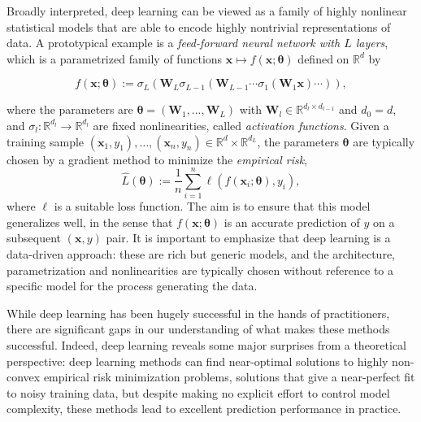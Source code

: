 Broadly interpreted, deep learning can be viewed as a family of highly nonlinear statistical models that are able to encode highly nontrivial representations of data. A prototypical example is a {\em
feed-forward neural network with $L$ layers}, which is a parametrized family of functions ${\boldsymbol x}\mapsto f({\boldsymbol x};{\boldsymbol \theta})$ defined on ${\mathbb R}^d$ by

\begin{equation}\label{eqn:FFNN}
    f({\boldsymbol x};{\boldsymbol \theta}) := \sigma_L({\boldsymbol W}_L\sigma_{L-1}({\boldsymbol W}_{L-1}
      \cdots \sigma_1({\boldsymbol W}_1{\boldsymbol x})\cdots)),
  \end{equation}

where the parameters are ${\boldsymbol \theta}=({\boldsymbol W}_1,\ldots,{\boldsymbol W}_L)$ with ${\boldsymbol W}_l\in{\mathbb R}^{d_l\times d_{l-1}}$ and $d_0=d$, and
$\sigma_l: {\mathbb R}^{d_l}\to{\mathbb R}^{d_l}$ are fixed nonlinearities, called {\em activation functions}.  Given a training sample
$({\boldsymbol x}_1,y_1),\ldots,({\boldsymbol x}_n,y_n)\in{\mathbb R}^{d}\times{\mathbb R}^{d_L}$, the parameters ${\boldsymbol \theta}$ are typically chosen by a gradient method to minimize the {\em empirical risk},
  \[
    \widehat L({\boldsymbol \theta}) := \frac{1}{n}\sum_{i=1}^n \ell(f({\boldsymbol x}_i;{\boldsymbol \theta}),y_i),
  \]
where $\ell$ is a suitable loss function. The aim is to ensure that this model generalizes well, in the sense that $f({\boldsymbol x};{\boldsymbol \theta})$
is an accurate prediction of $y$ on a subsequent $({\boldsymbol x},y)$ pair. It is important to emphasize that deep learning is a data-driven approach: these are rich but generic models, and the architecture, parametrization and nonlinearities are typically chosen without reference to a specific model for the process generating the data.

While deep learning has been hugely successful in the hands of practitioners, there are significant gaps in our understanding of what makes these methods successful. Indeed, deep learning reveals some major surprises from a theoretical perspective: deep learning methods can find near-optimal solutions to highly non-convex empirical risk minimization problems, solutions that give a near-perfect fit to noisy training data, but despite making no explicit effort to control model complexity, these methods lead to excellent prediction performance in practice.


